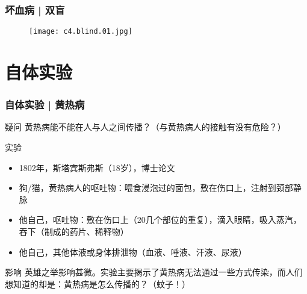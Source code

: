 \begin{frame}
  \frametitle{坏血病 | 双盲}
  \begin{figure}
    \centering
    \texttt{[image: c4.blind.01.jpg]}
  \end{figure}
\end{frame}

\section{自体实验}
\begin{frame}
  \frametitle{自体实验 | 黄热病}
  \begin{block}{疑问}
    黄热病能不能在人与人之间传播？（与黄热病人的接触有没有危险？）
  \end{block}
  \pause
  \begin{block}{实验}
    \begin{itemize}
      \item 1802年，斯塔宾斯\textbullet 弗斯（18岁），博士论文
      \item 狗/猫，黄热病人的呕吐物：喂食浸泡过的面包，敷在伤口上，注射到颈部静脉
      \item 他自己，呕吐物：敷在伤口上（20几个部位的重复），滴入眼睛，吸入蒸汽，吞下（制成的药片、稀释物）
      \item 他自己，其他体液或身体排泄物（血液、唾液、汗液、尿液）
    \end{itemize}
  \end{block}
  \pause
  \begin{block}{影响}
英雄之举影响甚微。实验主要揭示了黄热病无法通过一些方式传染，而人们想知道的却是：黄热病是怎么传播的？（蚊子！）
  \end{block}
\end{frame}

